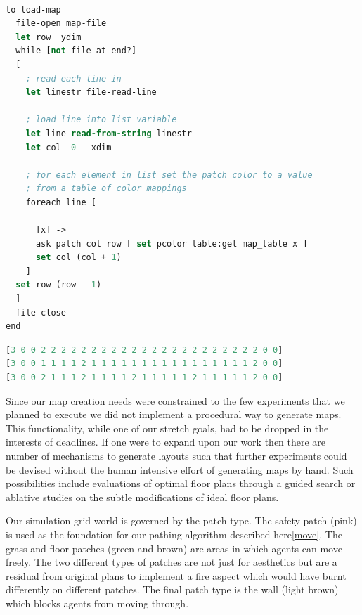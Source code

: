 \documentclass[12pt,letterpaper]{article}
\begin{document}
\begin{lstlisting}[language=lisp, caption={Map loading procedure in NetLogo},captionpos=b]

to load-map
  file-open map-file
  let row  ydim
  while [not file-at-end?]
  [
    ; read each line in	
    let linestr file-read-line

    ; load line into list variable
    let line read-from-string linestr
    let col  0 - xdim

    ; for each element in list set the patch color to a value
    ; from a table of color mappings
    foreach line [
      
      [x] ->
      ask patch col row [ set pcolor table:get map_table x ]
      set col (col + 1)
    ]
  set row (row - 1)
  ]
  file-close
end
\end{lstlisting}

\begin{lstlisting}[language=lisp, caption={Example map file, 3 rows},captionpos=b]
[3 0 0 2 2 2 2 2 2 2 2 2 2 2 2 2 2 2 2 2 2 2 2 2 2 0 0]
[3 0 0 1 1 1 1 2 1 1 1 1 1 1 1 1 1 1 1 1 1 1 1 1 2 0 0]
[3 0 0 2 1 1 1 2 1 1 1 1 2 1 1 1 1 1 2 1 1 1 1 1 2 0 0]
\end{lstlisting}

Since our map creation needs were constrained to the few experiments that we planned to execute we did not implement a procedural way to generate maps.  This functionality, while one of our stretch goals, had to be dropped in the interests of deadlines.  If one were to expand upon our work then there are number of mechanisms to generate layouts \cite{mirahmadiNovelAlgorithmRealtime2012} such that further experiments could be devised without the human intensive effort of generating maps by hand.  Such possibilities include evaluations of optimal floor plans through a guided search or ablative studies on the subtle modifications of ideal floor plans.

Our simulation grid world is governed by the patch type.  The safety patch (pink) is used as the foundation for our pathing algorithm described here\ref{move}.  The grass and floor patches (green and brown) are areas in which agents can  move freely.  The two different types of patches are not just for aesthetics but are a residual from original plans to implement a fire aspect which would have burnt differently on different patches.  The final patch type is the wall (light brown) which blocks agents from moving through.
\end{document}
